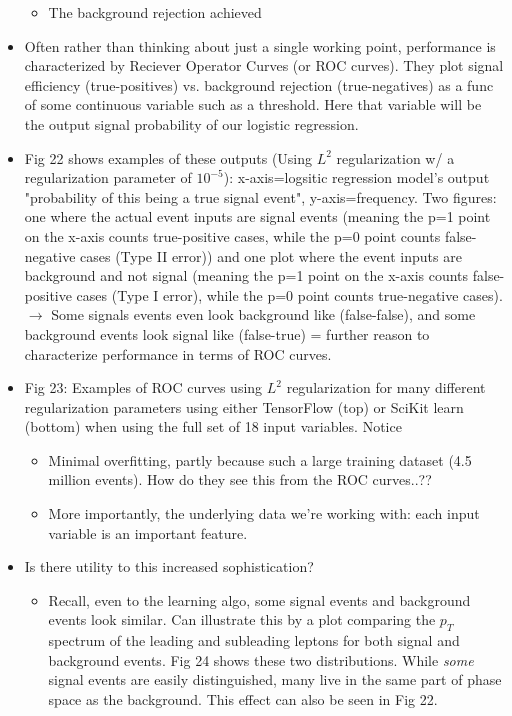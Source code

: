 \documentclass[norsk,a4paper,11pt]{article}
\begin{document}
\begin{itemize}
\begin{itemize}
		\item The background rejection achieved
	\end{itemize} 
	\item Often rather than thinking about just a single working point, performance is characterized by Reciever Operator Curves (or ROC curves). They plot signal efficiency (true-positives) vs. background rejection (true-negatives) as a func of some continuous variable such as a threshold. Here that variable will be the output signal probability of our logistic regression. 
	\item Fig 22 shows examples of these outputs (Using $L^2$ regularization w/ a regularization parameter of $10^{-5}$): x-axis=logsitic regression model's output "probability of this being a true signal event", y-axis=frequency. Two figures: one where the actual event inputs are signal events (meaning the p=1 point on the x-axis counts true-positive cases, while the p=0 point counts false-negative cases (Type II error)) and one plot where the event inputs are background and not signal (meaning the p=1 point on the x-axis counts false-positive cases (Type I error), while the p=0 point counts true-negative cases). $\rightarrow$ Some signals events even look background like (false-false), and some background events look signal like (false-true) = further reason to characterize performance in terms of ROC curves.
	\item Fig 23: Examples of ROC curves using $L^2$ regularization for many different regularization parameters using either TensorFlow (top) or SciKit learn (bottom) when using the full set of 18 input variables. Notice
	\begin{itemize}
		\item Minimal overfitting, partly because such a large training dataset (4.5 million events). How do they see this from the ROC curves..??
		\item More importantly, the underlying data we're working with: each input variable is an important feature.
	\end{itemize}
	\item Is there utility to this increased sophistication?
	\begin{itemize}
		\item Recall, even to the learning algo, some signal events and background events look similar. Can illustrate this by a plot comparing the $p_T$ spectrum of the leading and subleading leptons for both signal and background events. Fig 24 shows these two distributions. While \textit{some} signal events are easily distinguished, many live in the same part of phase space as the background.  This effect can also be seen in Fig 22.

\end{itemize}
\end{itemize}
\end{document}
